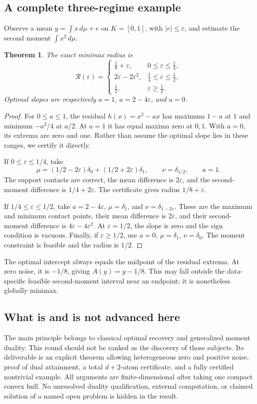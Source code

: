 \documentclass[11pt,a4paper]{article}
\newtheorem{theorem}{Theorem}[section]
\theoremstyle{definition}\newtheorem{definition}[theorem]{Definition}
\theoremstyle{remark}\newtheorem{remark}[theorem]{Remark}
\numberwithin{equation}{section}
\begin{document}
\subsection{A complete three-regime example}\label{M04-sec-5}
Observe a mean $y=\int x\,d\mu+e$ on $K=[0,1]$, with $|e|\le\varepsilon$, and estimate the second moment $\int x^2\,d\mu$.
\begin{theorem}
The exact minimax radius is
\[
 \mathcal R(\varepsilon)=
 \begin{cases}
 \frac18+\varepsilon,&0\le\varepsilon\le\frac14,\\
 2\varepsilon-2\varepsilon^2,&\frac14\le\varepsilon\le\frac12,\\
 \frac12,&\varepsilon\ge\frac12.
 \end{cases}
\]
Optimal slopes are respectively $a=1$, $a=2-4\varepsilon$, and $a=0$.
\end{theorem}
\begin{proof}
For $0\le a\le1$, the residual $h(x)=x^2-ax$ has maximum $1-a$ at $1$ and minimum $-a^2/4$ at $a/2$. At $a=1$ it has equal maxima zero at $0,1$. With $a=0$, its extrema are zero and one. Rather than assume the optimal slope lies in these ranges, we certify it directly.

If $0\le\varepsilon\le1/4$, take
\[
 \mu=(1/2-2\varepsilon)\delta_0+(1/2+2\varepsilon)\delta_1,
 \qquad\nu=\delta_{1/2},\qquad a=1.
\]
The support contacts are correct, the mean difference is $2\varepsilon$, and the second-moment difference is $1/4+2\varepsilon$. The certificate gives radius $1/8+\varepsilon$.

If $1/4\le\varepsilon\le1/2$, take $a=2-4\varepsilon$, $\mu=\delta_1$, and $\nu=\delta_{1-2\varepsilon}$. These are the maximum and minimum contact points, their mean difference is $2\varepsilon$, and their second-moment difference is $4\varepsilon-4\varepsilon^2$. At $\varepsilon=1/2$, the slope is zero and the sign condition is vacuous. Finally, if $\varepsilon\ge1/2$, use $a=0$, $\mu=\delta_1$, $\nu=\delta_0$. The moment constraint is feasible and the radius is $1/2$.
\end{proof}
The optimal intercept always equals the midpoint of the residual extrema. At zero noise, it is $-1/8$, giving $A(y)=y-1/8$. This may fall outside the data-specific feasible second-moment interval near an endpoint; it is nonetheless globally minimax.

\subsection{What is and is not advanced here}\label{M04-sec-6}
The main principle belongs to classical optimal recovery and generalized moment duality. This round should not be ranked as the discovery of those subjects. Its deliverable is an explicit theorem allowing heterogeneous zero and positive noise, proof of dual attainment, a total $d+2$-atom certificate, and a fully certified nontrivial example. All arguments are finite-dimensional after taking one compact convex hull. No unresolved duality qualification, external computation, or claimed solution of a named open problem is hidden in the result.
\end{document}
